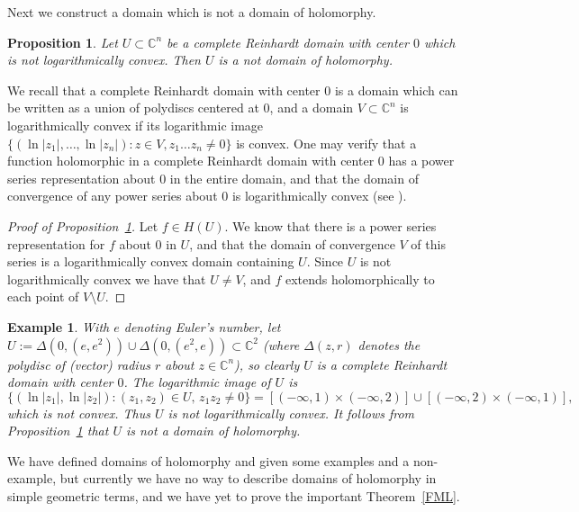\documentclass[11pt,a4paper, final, twoside]{article}
\newtheorem{example}[theorem]{Example}
\newtheorem{proposition}[theorem]{Proposition}
\numberwithin{equation}{section}
\newcommand{\C}{\mathbb C}
\newcommand{\pdisc}{\Delta}
\newcommand{\hol}{H}
\begin{document}
Next we construct a domain which is not a domain of holomorphy.
\begin{proposition}
\label{reinloghol}
Let $U\subset\C^n$ be a complete Reinhardt domain with center $0$ which is not logarithmically convex. Then $U$ is a not domain of holomorphy.
\end{proposition}
We recall that a complete Reinhardt domain with center $0$ is a domain which can be written as a union of polydiscs
centered at $0$, and a domain $V\subset\C^n$ is logarithmically convex if its logarithmic image $\{(\ln|z_1|,\dots,\ln|z_n|)\colon z\in V,z_1\dots z_n\neq 0\}$ is convex.
One may verify that a function holomorphic in a complete Reinhardt domain with center $0$ has a power series representation about $0$ in the entire domain, and that the domain of convergence of any power series
about $0$ is logarithmically convex (see \cite[subsection 7]{itca}).
\begin{proof}[Proof of Proposition~\ref{reinloghol}]
Let $f\in\hol(U)$. We know that there is a power series representation for $f$ about $0$ in $U$, and that the domain of convergence $V$ of this series is a logarithmically convex
domain containing $U$. Since $U$ is not logarithmically convex we have that $U\neq V$, and $f$ extends holomorphically to each point of $V\setminus U$.
\end{proof}
\begin{example}
With $e$ denoting Euler's number, 
let $U:=\pdisc(0,(e,e^2))\cup \pdisc(0,(e^2,e))\subset\C^2$ (where $\pdisc(z,r)$ denotes the polydisc of (vector) radius $r$ about $z\in\C^n$), so clearly $U$ is a complete Reinhardt domain with center $0$. 
The logarithmic image of $U$ is
$$
 \{(\ln|z_1|,\ln|z_2|)\colon (z_1,z_2)\in U,\,z_1z_2\neq 0\}= 
	[(-\infty,1)\times (-\infty,2)]\cup [(-\infty,2)\times (-\infty,1)],$$
which is not convex. Thus $U$ is not logarithmically convex. It follows from Proposition~\ref{reinloghol} that $U$ is not a domain of holomorphy.
\end{example}
We have defined domains of holomorphy and given some examples and a non-example, but currently we have no way to describe domains of holomorphy in simple geometric terms, and we have
yet to prove the important Theorem~\ref{FML}.
\end{document}
